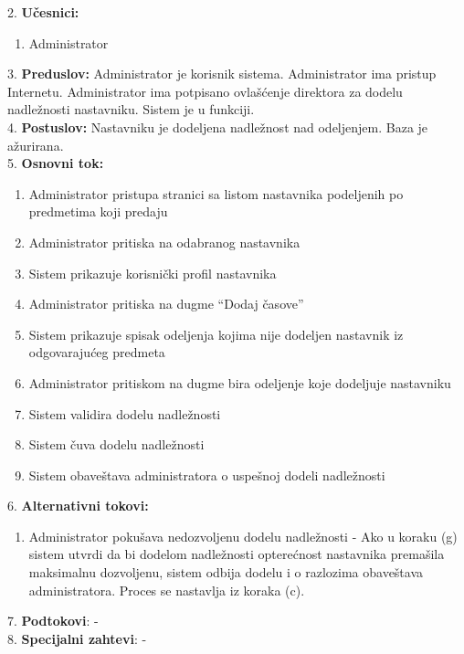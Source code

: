 \documentclass{article}
\begin{document}
2. \textbf{Učesnici:}
\begin{enumerate} [label=(\alph*)]
\item Administrator
\end{enumerate} 

3. \textbf{Preduslov:} Administrator je korisnik sistema. Administrator ima pristup Internetu. Administrator ima potpisano ovlašćenje direktora za dodelu nadležnosti nastavniku. Sistem je u funkciji. \\

4. \textbf{Postuslov:} Nastavniku je dodeljena nadležnost nad odeljenjem. Baza je ažurirana. \\

5. \textbf{Osnovni tok:} 
\begin{enumerate} [label=(\alph*)]
\item Administrator pristupa stranici sa listom nastavnika podeljenih po predmetima koji predaju
\item Administrator pritiska na odabranog nastavnika
\item Sistem prikazuje korisnički profil nastavnika
\item Administrator pritiska na dugme ``Dodaj časove''
\item Sistem prikazuje spisak odeljenja kojima nije dodeljen nastavnik iz odgovarajućeg predmeta
\item Administrator pritiskom na dugme bira odeljenje koje dodeljuje nastavniku
\item Sistem validira dodelu nadležnosti
\item Sistem čuva dodelu nadležnosti
\item Sistem obaveštava administratora o uspešnoj dodeli nadležnosti
\end{enumerate}

6. \textbf{Alternativni tokovi:}
\begin{enumerate} [label=(\roman*)]
    \item Administrator pokušava nedozvoljenu dodelu nadležnosti - Ako u koraku (g) sistem utvrdi da bi dodelom nadležnosti opterećnost nastavnika premašila maksimalnu dozvoljenu, sistem odbija dodelu i o razlozima obaveštava administratora. Proces se nastavlja iz koraka (c).
\end{enumerate}

7. \textbf{Podtokovi}: - \\

8. \textbf{Specijalni zahtevi}: - \\
\end{document}
